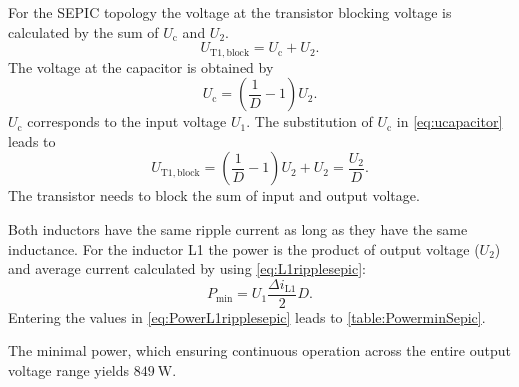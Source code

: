 \begin{solutionblock}
    For the SEPIC topology the voltage at the transistor blocking voltage is calculated by the sum of 
    $U_\mathrm{c}$ and $U_\mathrm{2}$.
    \begin{equation}
        U_\mathrm{T1,block}=U_\mathrm{c}+U_\mathrm{2}.
    \end{equation}
    The voltage at the capacitor is obtained by
    \begin{equation}
        U_\mathrm{c}=\left( \frac{1}{D}-1\right) U_\mathrm{2}.
        \label{eq:ucapacitor}        
    \end{equation}
    $U_\mathrm{c}$ corresponds to the input voltage $U_\mathrm{1}$. The substitution of $U_\mathrm{c}$ in \eqref{eq:ucapacitor} leads to 
    \begin{equation}
        U_\mathrm{T1,block}=\left( \frac{1}{D}-1\right) U_\mathrm{2}+U_\mathrm{2}=\frac{U_\mathrm{2}}{D}.
    \end{equation}
    The transistor needs to block the sum of input and output voltage.
\end{solutionblock}



\begin{solutionblock}
    Both inductors have the same ripple current as long as they have the same inductance.
    For the inductor L1 the power is the product of output voltage
     ($U_\mathrm{2}$) and average current calculated by using \eqref{eq:L1ripplesepic}:
    \begin{equation}
        P_\mathrm{min}=U_\mathrm{1}\frac{\Delta i_\mathrm{L1}}{2}D.
        \label{eq:PowerL1ripplesepic}
    \end{equation}
    Entering the values in \eqref{eq:PowerL1ripplesepic} leads to \autoref{table:PowerminSepic}.
    
    The minimal power, which ensuring continuous operation across the entire output voltage range
    yields  $\SI{849}{\watt}$.

\end{solutionblock}

